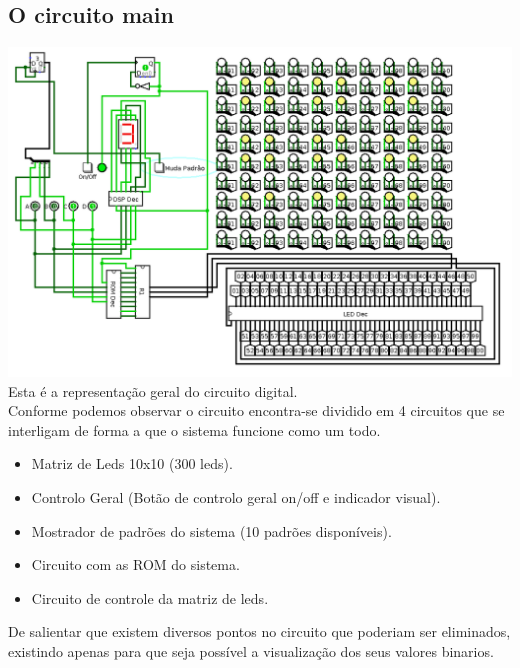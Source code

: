 \documentclass[12pt,a4paper,portrait]{article}
\begin{document}
		\subsection{O circuito main}
			\includegraphics[width=1.0\textwidth]{imagens/main}\\
			Esta é a representação geral do circuito digital.\\
			Conforme podemos observar o circuito encontra-se dividido em 4 circuitos que se interligam de forma a que o sistema funcione como um todo.\\
			\begin{itemize}
				\item Matriz de Leds 10x10 (300 leds).
				\item Controlo Geral (Botão de controlo geral on/off e indicador visual).
				\item Mostrador de padrões do sistema (10 padrões disponíveis).
				\item Circuito com as ROM do sistema.
				\item Circuito de controle da matriz de leds.
			\end{itemize}
			De salientar que existem diversos pontos no circuito que poderiam ser eliminados, existindo apenas para que seja possível a visualização dos seus valores binarios.\\
\end{document}
